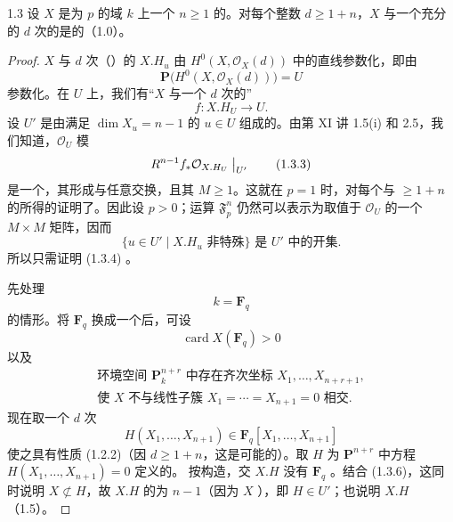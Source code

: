 \begin{SGAresult}{}{1.3}
设 $X$ 是为 $p$ 的域 $k$ 上一个 $n\geq1$ 的。对每个整数 $d\geq1+n$，$X$ 与一个充分的 $d$ 次的是的（1.0）。
\end{SGAresult}
\begin{proof}
$X$ 与 $d$ 次（）的 $X.H_u$ 由 $H^0(X,\mathcal O_X(d))$ 中的直线参数化，即由
\[
 \mathbf P\bigl(H^0(X,\mathcal O_X(d))\bigr)=U
 \tag{1.3.1}
\]
参数化。在 $U$ 上，我们有“$X$ 与一个 $d$ 次的”
\[
 f:X.H_U\longrightarrow U.
 \tag{1.3.2}
\]
设 $U'$ 是由满足 $\dim X_u=n-1$ 的 $u\in U$ 组成的。由第 XI 讲 1.5(i) 和 2.5，我们知道，$\mathcal O_U$ 模
\[
 R^{n-1}f_*\mathcal O_{X.H_U}\bigm|_{U'}
 \tag{1.3.3}
\]
是一个，其形成与任意交换，且其 $M\geq1$。这就在 $p=1$ 时，对每个与 $\geq1+n$ 的所得的证明了。因此设 $p>0$；运算 $\mathfrak F_p^n$ 仍然可以表示为取值于 $\mathcal O_U$ 的一个 $M\times M$ 矩阵，因而
\[
 \{u\in U'\mid X.H_u\text{ 非特殊}\}\text{ 是 }U'\text{ 中的开集}.
 \tag{1.3.4}
\]
所以只需证明 (1.3.4) 。

先处理
\[
 k=\mathbf F_q
 \tag{1.3.5}
\]
的情形。将 $\mathbf F_q$ 换成一个后，可设
\[
 \operatorname{card}X(\mathbf F_q)>0
 \tag{1.3.6}
\]
以及
\[
 \begin{gathered}
 \text{环境空间 }\mathbf P^{n+r}_k\text{ 中存在齐次坐标 }X_1,\ldots,X_{n+r+1},\\
 \text{使 }X\text{ 不与线性子簇 }X_1=\cdots=X_{n+1}=0\text{ 相交}.
 \end{gathered}
 \tag{1.3.7}
\]
现在取一个 $d$ 次
\[
 H(X_1,\ldots,X_{n+1})\in\mathbf F_q[X_1,\ldots,X_{n+1}]
 \tag{1.3.8}
\]
使之具有性质 (1.2.2)（因 $d\geq1+n$，这是可能的）。取 $H$ 为 $\mathbf P^{n+r}$ 中方程 $H(X_1,\ldots,X_{n+1})=0$ 定义的。
按构造，交 $X.H$ 没有 $\mathbf F_q$ 。结合 (1.3.6)，这同时说明 $X\not\subset H$，故 $X.H$ 的为 $n-1$（因为 $X$ ），即 $H\in U'$；也说明 $X.H$ （1.5）。


\end{proof}
